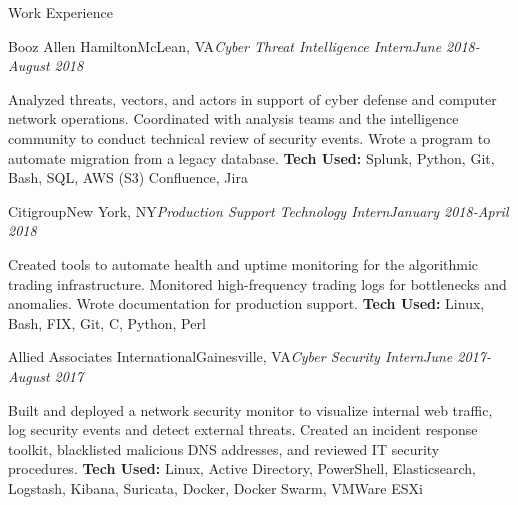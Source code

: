 \documentclass{resume}
\begin{document}

\begin{rSection}{Work Experience}

\begin{rSubsection}{Booz Allen Hamilton}{McLean, VA}{\em Cyber Threat Intelligence Intern}{\em June 2018-August 2018}
\item Analyzed threats, vectors, and actors in support of cyber defense and computer network operations. Coordinated with analysis teams and the intelligence community to conduct technical review of security events. Wrote a program to automate migration from a legacy database. 
{\bf Tech Used:} Splunk, Python, Git, Bash, SQL, AWS (S3) Confluence, Jira
\end{rSubsection}

\begin{rSubsection}{Citigroup}{New York, NY}{\em Production Support Technology Intern}{\em January 2018-April 2018}
\item Created tools to automate health and uptime monitoring for the algorithmic trading infrastructure. Monitored high-frequency trading logs for bottlenecks and anomalies. Wrote documentation for production support. 
{\bf Tech Used:} Linux, Bash, FIX, Git, C, Python, Perl
\end{rSubsection}

\begin{rSubsection}{Allied Associates International}{Gainesville, VA}{\em Cyber Security Intern}{\em June 2017-August 2017}
\item Built and deployed a network security monitor to visualize internal web traffic, log security events and detect external threats. Created an incident response toolkit, blacklisted malicious DNS addresses, and reviewed IT security procedures. 
{\bf Tech Used:} Linux, Active Directory, PowerShell, Elasticsearch, Logstash, Kibana, Suricata, Docker, Docker Swarm, VMWare ESXi
\end{rSubsection}

\end{rSection}
\end{document}
